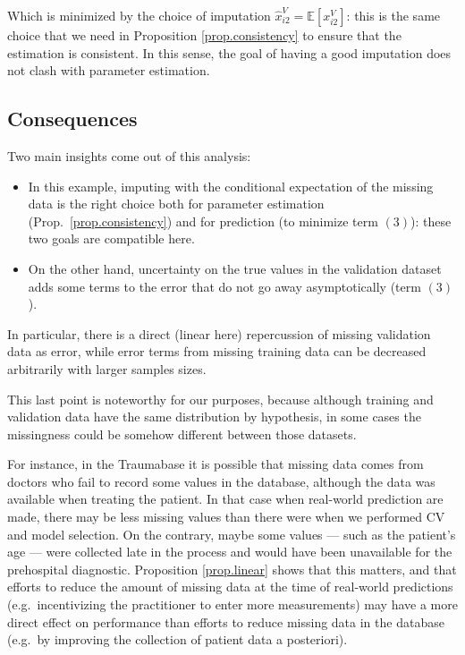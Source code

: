 Which is minimized by the choice of imputation $\hat{x}_{i2}^V = \mathbb{E}[x_{i2}^V]$: this is the same choice that we need in Proposition \ref{prop.consistency} to ensure that the estimation is consistent. In this sense, the goal of having a good imputation does not clash with parameter estimation.
		\subsection{Consequences}
Two main insights come out of this analysis:

\begin{itemize}
\item In this example, imputing with the conditional expectation of the missing data is the right choice both for parameter estimation (Prop.\ \ref{prop.consistency}) and for prediction (to minimize term $(3)$): these two goals are compatible here.

\item On the other hand, uncertainty on the true values in the validation dataset adds some terms to the error that do not go away asymptotically (term $(3)$). 
\end{itemize}

In particular, there is a direct (linear here) repercussion of missing validation data as error, while error terms from missing training data can be decreased arbitrarily with larger samples sizes.

This last point is noteworthy for our purposes, because although training and validation data have the same distribution by hypothesis, in some cases the missingness could be somehow different between those datasets. 

For instance, in the Traumabase it is possible that missing data comes from doctors who fail to record some values in the database, although the data was available when treating the patient. In that case when real-world prediction are made, there may be less missing values than there were when we performed CV and model selection. On the contrary, maybe some values --- such as the patient's age --- were collected late in the process and would have been unavailable for the prehospital diagnostic. Proposition \ref{prop.linear} shows that this matters, and that efforts to reduce the amount of missing data at the time of real-world predictions (e.g.\ incentivizing the practitioner to enter more measurements) may have a more direct effect on performance than efforts to reduce missing data in the database (e.g.\ by improving the collection of patient data a posteriori). 